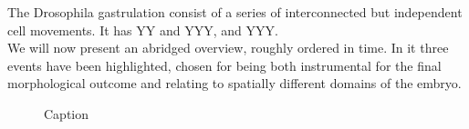 The Drosophila gastrulation consist of a series of interconnected but independent cell movements. It has YY and YYY, and YYY. \\
We will now present an abridged overview, roughly ordered in time. In it three events have been highlighted, chosen for being both instrumental for the final morphological outcome and relating to spatially different domains of the embryo. 



\newpage

\begin{figure}[H]
    \centering
    \vspace*{-1cm}
    \caption{Caption}
    \label{fig:big-timeline}
\end{figure}
\newpage
\addtocounter{figure}{-1}
